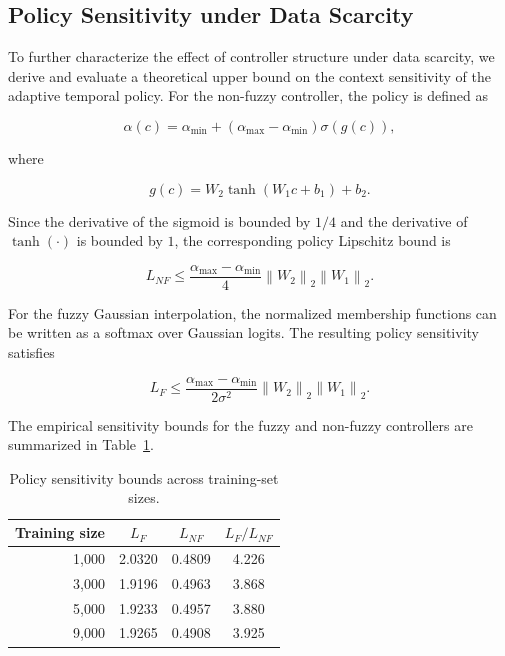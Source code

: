 \documentclass[journal]{IEEEtran}
\begin{document}
	
	\subsection{Policy Sensitivity under Data Scarcity}
	
	To further characterize the effect of controller structure under data scarcity, we derive and evaluate a theoretical upper bound on the context sensitivity of the adaptive temporal policy. For the non-fuzzy controller, the policy is defined as
	
	\begin{equation}
		\alpha(c)=\alpha_{\min}
		+(\alpha_{\max}-\alpha_{\min})\sigma(g(c)),
	\end{equation}
	
	where
	
	\begin{equation}
		g(c)=W_2\tanh(W_1c+b_1)+b_2.
	\end{equation}
	
	Since the derivative of the sigmoid is bounded by $1/4$ and the derivative of
	$\tanh(\cdot)$ is bounded by $1$, the corresponding policy Lipschitz bound is
	
	\begin{equation}
		L_{NF}
		\leq
		\frac{\alpha_{\max}-\alpha_{\min}}{4}
		\left\|W_2\right\|_2
		\left\|W_1\right\|_2.
		\label{eq:nonfuzzy_policy_bound}
	\end{equation}
	
	For the fuzzy Gaussian interpolation, the normalized membership functions can be written as a softmax over Gaussian logits. The resulting policy sensitivity satisfies
	
	\begin{equation}
		L_F
		\leq
		\frac{\alpha_{\max}-\alpha_{\min}}
		{2\sigma^2}
		\left\|W_2\right\|_2
		\left\|W_1\right\|_2.
		\label{eq:fuzzy_policy_bound}
	\end{equation}
	
	The empirical sensitivity bounds for the fuzzy and non-fuzzy controllers are summarized in Table~\ref{tab:policy_sensitivity}.
	
	\begin{table}[t]
		\centering
		\caption{Policy sensitivity bounds across training-set sizes.}
		\label{tab:policy_sensitivity}
		\begin{tabular}{rccc}
			\toprule
			Training size & $L_F$ & $L_{NF}$ & $L_F/L_{NF}$ \\
			\midrule
			1,000 & 2.0320 & 0.4809 & 4.226 \\
			3,000 & 1.9196 & 0.4963 & 3.868 \\
			5,000 & 1.9233 & 0.4957 & 3.880 \\
			9,000 & 1.9265 & 0.4908 & 3.925 \\
			\bottomrule
		\end{tabular}
	\end{table}
	
\end{document}
